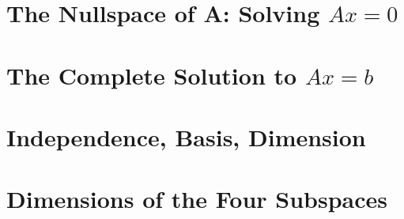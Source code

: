 \section{The Nullspace of A: Solving \(Ax = 0\)}

\section{The Complete Solution to \(Ax = b\)}

\section{Independence, Basis, Dimension}

\section{Dimensions of the Four Subspaces}
